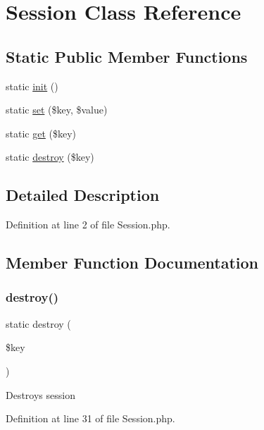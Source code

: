 \hypertarget{class_session}{}\section{Session Class Reference}
\label{class_session}
\subsection*{Static Public Member Functions}
\begin{DoxyCompactItemize}
\item 
static \hyperlink{class_session_a9f0be6ae273d3669e11c29910a0be338}{init} ()
\item 
static \hyperlink{class_session_aa485369b2925858d92e468d405bd0798}{set} (\$key, \$value)
\item 
static \hyperlink{class_session_a15e2679f2a8f6fa4d60757f4d65413ac}{get} (\$key)
\item 
static \hyperlink{class_session_a84a343032e96995b7c252c719ddc764b}{destroy} (\$key)
\end{DoxyCompactItemize}


\subsection{Detailed Description}


Definition at line 2 of file Session.\+php.



\subsection{Member Function Documentation}
\hypertarget{class_session_a84a343032e96995b7c252c719ddc764b}{}\label{class_session_a84a343032e96995b7c252c719ddc764b} 
\subsubsection{\texorpdfstring{destroy()}{destroy()}}
{\footnotesize\ttfamily static destroy (\begin{DoxyParamCaption}\item[{}]{\$key }\end{DoxyParamCaption})\hspace{0.3cm}{\ttfamily [static]}}

Destroys session 

Definition at line 31 of file Session.\+php.



